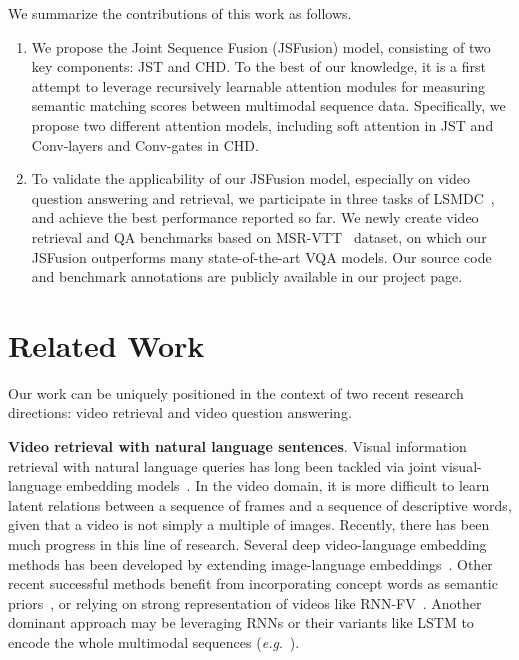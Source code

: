 \documentclass[runningheads]{llncs}
\makeatletter
\DeclareRobustCommand\onedot{\futurelet\@let@token\@onedot}
\def\onedot{.\@\xspace}
\def\eg{\textit{e.g}\onedot} \def\Eg{\textit{E.g}\onedot}
\makeatother
\begin{document}
We summarize the contributions of this work as follows.

\begin{enumerate}
\item We propose the Joint Sequence Fusion (JSFusion) model, consisting of two key components: JST and CHD. 
To the best of our knowledge, it is a first attempt to leverage recursively learnable attention modules for measuring semantic matching scores between multimodal sequence data.   
Specifically, we propose two different attention models, including soft attention in JST and Conv-layers and Conv-gates in CHD. 
\item To validate the applicability of our JSFusion model, especially on video question answering and retrieval, 
we participate in three tasks of LSMDC~\cite{rohrbach-arxiv-2016}, and achieve the best performance reported so far. 
We newly create video retrieval and QA benchmarks based on MSR-VTT~\cite{xu-CVPR-2016} dataset, on which our JSFusion outperforms many state-of-the-art VQA models.  Our source code and benchmark annotations are publicly available in our project page. \end{enumerate}





\section{Related Work}
\label{sec:related_work}

Our work can be uniquely positioned in the context of two recent research directions: video retrieval and video question answering.

\textbf{Video retrieval with natural language sentences}.
Visual information retrieval with natural language queries has long been tackled via  joint visual-language embedding models~\cite{torabi-arxiv-2016,kiros-tacl-2014,hodosh-JAIR-2013,lin-CVPR-2014,vendrov-arxiv-2015,hu-cvpr-2016,mao-cvpr-2016}.
In the video domain, it is more difficult to learn latent relations between a sequence of frames and a sequence of descriptive words, given that a video is not simply a multiple of images.
Recently, there has been much progress in this line of research. Several deep video-language embedding methods \cite{xu-aaai-2015,torabi-arxiv-2016,mayu-arxiv-2016} has been developed by extending image-language embeddings~\cite{frome-nips-2013,socher-tacl-2014}. 
Other recent successful methods benefit from incorporating concept words as semantic priors~\cite{yu-cvpr-2017,yu-arxiv-2016}, or relying on strong representation of videos like RNN-FV~\cite{kaufman-iccv-2017}. 
Another dominant approach may be leveraging RNNs or their variants like LSTM to encode the whole multimodal sequences (\eg~\cite{yu-cvpr-2017,torabi-arxiv-2016,yu-arxiv-2016,kaufman-iccv-2017}).  
\end{document}
